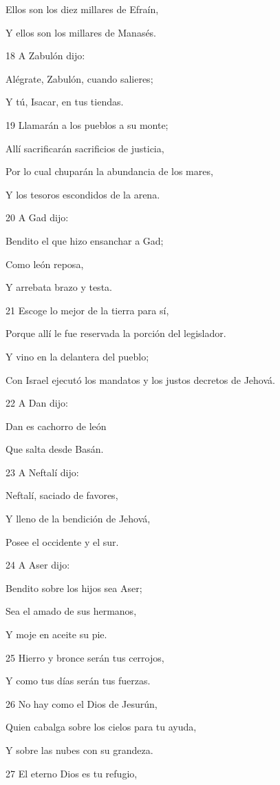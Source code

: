 \par Ellos son los diez millares de Efraín,
\par Y ellos son los millares de Manasés. 
\par 18 A Zabulón dijo:
\par Alégrate, Zabulón, cuando salieres;
\par Y tú, Isacar, en tus tiendas.
\par 19 Llamarán a los pueblos a su monte;
\par Allí sacrificarán sacrificios de justicia,
\par Por lo cual chuparán la abundancia de los mares,
\par Y los tesoros escondidos de la arena.
\par 20 A Gad dijo:
\par Bendito el que hizo ensanchar a Gad;
\par Como león reposa,
\par Y arrebata brazo y testa.
\par 21 Escoge lo mejor de la tierra para sí,
\par Porque allí le fue reservada la porción del legislador.
\par Y vino en la delantera del pueblo;
\par Con Israel ejecutó los mandatos y los justos decretos de Jehová.
\par 22 A Dan dijo:
\par Dan es cachorro de león
\par Que salta desde Basán.
\par 23 A Neftalí dijo:
\par Neftalí, saciado de favores,
\par Y lleno de la bendición de Jehová,
\par Posee el occidente y el sur.
\par 24 A Aser dijo:
\par Bendito sobre los hijos sea Aser;
\par Sea el amado de sus hermanos,
\par Y moje en aceite su pie.
\par 25 Hierro y bronce serán tus cerrojos,
\par Y como tus días serán tus fuerzas.
\par 26 No hay como el Dios de Jesurún,
\par Quien cabalga sobre los cielos para tu ayuda,
\par Y sobre las nubes con su grandeza.
\par 27 El eterno Dios es tu refugio,
